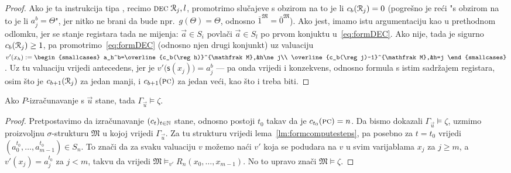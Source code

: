 \begin{proof}
	Ako je ta instrukcija tipa \dec, recimo $\textsc{dec}\;\mathcal R_{j},l$, promotrimo slučajeve s obzirom na to je li $c_b(\mathcal R_{j})=0$ (pogrešno je reći "s obzirom na to je li $a_j^b=\Theta$", jer nitko ne brani da bude npr.\ $g(\Theta)=\Theta$, odnosno $\overline1^{\mathfrak M}=\overline0^{\mathfrak M}$). Ako jest, imamo istu argumentaciju kao u prethodnom odlomku, jer se stanje registara tada ne mijenja: $\vec a\in S_i$ povlači $\vec a\in S_l$ po prvom konjuktu u~\eqref{eq:formDEC}. Ako nije, tada je sigurno $c_b(\mathcal R_{j})\ge1$, pa promotrimo~\eqref{eq:formDEC} (odnosno njen drugi konjunkt) uz valuaciju
$v'(x_h):=\begin{smallcases}
	a_h^b=\overline{c_b(\reg h)}^{\mathfrak M},&h\ne j\\
	\overline{c_b(\reg j)-1}^{\mathfrak M},&h=j
\end{smallcases}$.
Uz tu valuaciju vrijedi antecedens, jer je $v'\bigl(\mathsf s(x_j)\bigr)=a_j^b$ --- pa onda vrijedi i konzekvens, odnosno formula s istim sadržajem registara, osim što je $c_{b+1}(\mathcal R_{j})$ za jedan manji, i $c_{b+1}(\textsc{pc})$ za jedan veći, kao što i treba biti.
\end{proof}

\begin{propozicija}[{name=[zaustavljanje povlači zaključivanje]}]\label{pp:stop>models}
Ako $P$-izračunavanje s $\vec u$ stane, tada $\Gamma_{\vec u}\models\zeta$.
\end{propozicija}
\begin{proof}
	Pretpostavimo da izračunavanje $(c_t)_{t\in{\mathbb N}}$ stane, odnosno postoji $t_0$ takav da je $c_{t_0}(\textsc{pc})=n$. Da bismo dokazali $\Gamma_{\vec u}\models\zeta$, uzmimo proizvoljnu $\sigma$-strukturu $\mathfrak M$ u kojoj vrijedi $\Gamma_{\vec u}$. Za tu strukturu vrijedi lema~\ref{lm:formcomputesteps}, pa posebno za $t=t_0$ vrijedi $(a_0^{t_0},\dotsc,a_{m-1}^{t_0})\in S_n$. To znači da za svaku valuaciju $v$ možemo naći $v'$ koja se podudara na $v$ u svim varijablama $x_j$ za $j\ge m$, a $v'(x_j)=a_j^{t_0}$ za $j<m$, takvu da vrijedi $\mathfrak M\models_{v'}R_n(x_0,\dotsc,x_{m-1})$. No to upravo znači $\mathfrak M\models\zeta$.
\end{proof}


